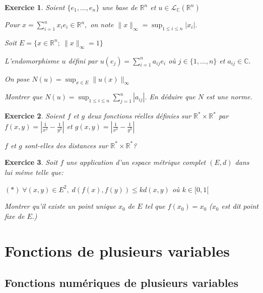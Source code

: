 \documentclass[11pt,a4paper]{report}
\newtheorem{exo}{Exercice}[section]
\begin{document}
\begin{exo}

Soient $\{e_1,...,e_n\}$ une base de $\mathbb{R}^n$ et $u\in \mathcal{L}_{\mathbb{C}}(\mathbb{R}^n)$

Pour $x=\sum_{i=1}^{n}x_i e_i\in \mathbb{R}^n,$ on note $\|x\|_{\infty}=\sup_{1\leq i\leq n}|x_i|.$

Soit $E=\{x\in \mathbb{R}^n;\:\|x\|_{\infty}=1\}$

L'endomorphisme $u$ défini par $u(e_j)=\sum_{i=1}^{n}a_{ij}e_i$ où $j\in \{1,...,n\}$ et $a_{ij}\in \mathbb{C}.$

On pose $N(u)=\sup_{x\in E}\|u(x)\|_{\infty}$

Montrer que $N(u)=\sup_{1\leq i\leq n}\sum_{j=1}^{n}|a_{ij}|.$ En déduire que $N$ est une norme.
\end{exo}

\begin{exo}
Soient $f$ et $g$ deux fonctions réelles définies sur $\mathbb{R}^{*}\times\mathbb{R}^{*}$ par $f(x,y)=|\frac{1}{x^2}-\frac{1}{y^2}|$ et $g(x,y)=|\frac{1}{x^3}-\frac{1}{y^3}|$

$f$ et $g$ sont-elles des distances sur $\mathbb{R}^{*}\times\mathbb{R}^{*}$?
\end{exo}

\begin{exo}
Soit $f$ une application d'un espace métrique complet $(E,d)$ dans lui même telle que:

$(*)\;\forall(x,y)\in E^2,\;d(f(x),f(y))\leq kd(x,y)$ où $k\in [0,1[$

Montrer qu'il existe un point unique $x_0$ de $E$ tel que $f(x_0)=x_0$ ($x_0$ est dit point fixe de $E.$)
\end{exo}
\chapter{Fonctions de plusieurs variables}
\section{Fonctions numériques de plusieurs variables}
\end{document}
